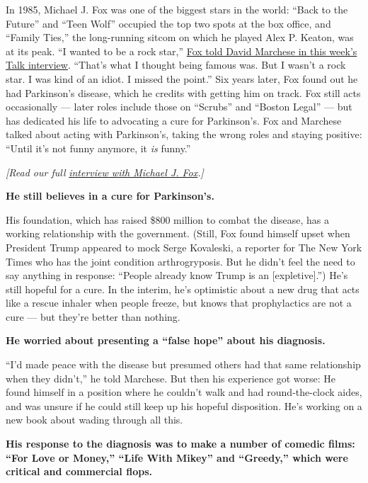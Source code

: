 In 1985, Michael J. Fox was one of the biggest stars in the world:
``Back to the Future'' and ``Teen Wolf'' occupied the top two spots at
the box office, and ``Family Ties,'' the long-running sitcom on which he
played Alex P. Keaton, was at its peak. ``I wanted to be a rock star,''
\href{https://www.nytimes3xbfgragh.onion/interactive/2019/03/01/magazine/michael-j-fox-parkinsons-acting.html}{Fox
told David Marchese in this week's Talk interview}. ``That's what I
thought being famous was. But I wasn't a rock star. I was kind of an
idiot. I missed the point.'' Six years later, Fox found out he had
Parkinson's disease, which he credits with getting him on track. Fox
still acts occasionally --- later roles include those on ``Scrubs'' and
``Boston Legal'' --- but has dedicated his life to advocating a cure for
Parkinson's. Fox and Marchese talked about acting with Parkinson's,
taking the wrong roles and staying positive: ``Until it's not funny
anymore, it \emph{is} funny.''

\emph{{[}Read our full}
\href{https://www.nytimes3xbfgragh.onion/interactive/2019/03/01/magazine/michael-j-fox-parkinsons-acting.html}{\emph{interview
with Michael J. Fox}}\emph{.{]}}

\textbf{He still believes in a cure for Parkinson's.}

His foundation, which has raised \$800 million to combat the disease,
has a working relationship with the government. (Still, Fox found
himself upset when President Trump appeared to mock Serge Kovaleski, a
reporter for The New York Times who has the joint condition
arthrogryposis. But he didn't feel the need to say anything in response:
``People already know Trump is an {[}expletive{]}.'') He's still hopeful
for a cure. In the interim, he's optimistic about a new drug that acts
like a rescue inhaler when people freeze, but knows that prophylactics
are not a cure --- but they're better than nothing.

\textbf{He worried about presenting a ``false hope'' about his
diagnosis.}

``I'd made peace with the disease but presumed others had that same
relationship when they didn't,'' he told Marchese. But then his
experience got worse: He found himself in a position where he couldn't
walk and had round-the-clock aides, and was unsure if he could still
keep up his hopeful disposition. He's working on a new book about wading
through all this.

\textbf{His response to the diagnosis was to make a number of comedic
films: ``For Love or Money,'' ``Life With Mikey'' and ``Greedy,'' which
were critical and commercial flops.}


